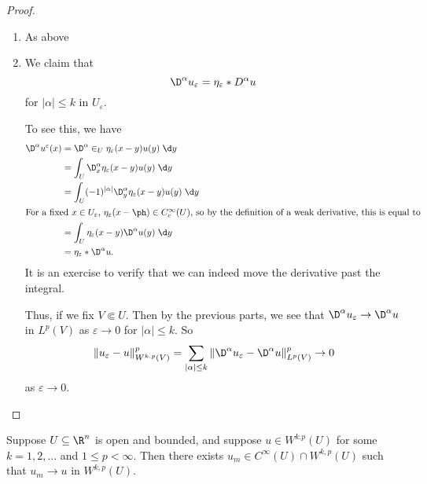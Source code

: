 \documentclass[a4paper]{article}
\begin{document}
\begin{proof}\leavevmode
  \begin{enumerate}
    \item As above
    \item We claim that
      \[
        \D^\alpha u_\varepsilon = \eta_\varepsilon * D^\alpha u
      \]
      for $|\alpha| \leq k$ in $U_\varepsilon$.

      To see this, we have
      \begin{align*}
        \D^\alpha u^\varepsilon(x) &= \D^\alpha \in_U \eta_\varepsilon(x - y) u(y) \;\d y\\
        &= \int_U \D^\alpha_x \eta_\varepsilon (x - y) u(y)\;\d y\\
        &= \int_U (-1)^{|\alpha|} \D_y^\alpha \eta_\varepsilon(x - y) u(y)\;\d y\\
        \intertext{For a fixed $x \in U_\varepsilon$, $\eta_\varepsilon(x - \ph) \in C_c^\infty(U)$, so by the definition of a weak derivative, this is equal to}
        &= \int_U \eta_\varepsilon(x - y) \D^\alpha u(y)\;\d y\\
        &= \eta_\varepsilon * \D^\alpha u.
      \end{align*}
      It is an exercise to verify that we can indeed move the derivative past the integral.

      Thus, if we fix $V \Subset U$. Then by the previous parts, we see that $\D^\alpha u_\varepsilon \to \D^\alpha u$ in $L^p(V)$ as $\varepsilon \to 0$ for $|\alpha| \leq k$. So
      \[
        \|u_\varepsilon - u\|^p_{W^{k. p}(V)} = \sum_{|\alpha| \leq k} \|\D^\alpha u_\varepsilon - \D^\alpha u\|^p_{L^p(V)} \to 0
      \]
      as $\varepsilon \to 0$.
  \end{enumerate}
\end{proof}

\begin{thm}
  Suppose $U \subseteq \R^n$ is open and bounded, and suppose $u \in W^{k. p}(U)$ for some $k = 1, 2, \ldots$ and $1 \leq p < \infty$. Then there exists $u_m \in C^\infty(U) \cap W^{k, p}(U)$ such that $u_m \to u$ in $W^{k, p}(U)$.
\end{thm}
\end{document}
